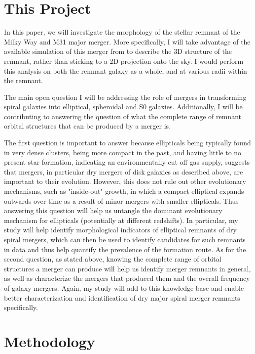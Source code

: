\documentclass[twocolumn]{aastex631}
\begin{document}
\section{This Project}

In this paper, we will investigate the morphology of the stellar remnant of the Milky Way and M31 major merger.
More specifically, I will take advantage of the available simulation of this merger from \cite{van_der_Marel+2012} to describe the 3D structure of the remnant, rather than sticking to a 2D projection onto the sky.
I would perform this analysis on both the remnant galaxy as a whole, and at various radii within the remnant.

The main open question I will be addressing the role of mergers in transforming spiral galaxies into elliptical, spheroidal and S0 galaxies. 
Additionally, I will be contributing to answering the question of what the complete range of remnant orbital structures that can be produced by a merger is. 

The first question is important to answer because ellipticals being typically found in very dense clusters, being more compact in the past, and having little to no present star formation, indicating an environmentally cut off gas supply, suggests that mergers, in particular dry mergers of disk galaxies as described above, are important to their evolution. 
However, this does not rule out other evolutionary mechanisms, such as "inside-out" growth, in which a compact elliptical expands outwards over time as a result of minor mergers with smaller ellipticals.
Thus answering this question will help us untangle the dominant evolutionary mechanism for ellipticals (potentially at different redshifts).
In particular, my study will help identify morphological indicators of elliptical remnants of dry spiral mergers, which can then be used to identify candidates for such remnants in data and thus help quantify the prevalence of the formation route.
As for the second question, as stated above, knowing the complete range of orbital structures a merger can produce will help us identify merger remnants in general, as well as characterize the mergers that produced them and the overall frequency of galaxy mergers.
Again, my study will add to this knowledge base and enable better characterization and identification of dry major spiral merger remnants specifically.

\section{Methodology}
\end{document}
